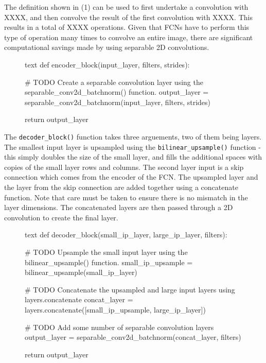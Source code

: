 \documentclass[a4paper]{article}
\begin{document}
The definition shown in (1) can be used to first undertake a convolution with XXXX, and then convolve the result of the first convolution with XXXX. This results in a total of XXXX operations. Given that FCNs have to perform this type of operation many times to convolve an entire image, there are significant computational savings made by using separable 2D convolutions.
   
\begin{figure}[h]\scriptsize
\begin{sexylisting}{text}
def encoder_block(input_layer, filters, strides):
    
    # TODO Create a separable convolution layer using the separable_conv2d_batchnorm() function.
    output_layer = separable_conv2d_batchnorm(input_layer, filters, strides)
    
    return output_layer
\end{sexylisting}
\end{figure}

The \verb|decoder_block()| function takes three arguements, two of them being layers. The smallest input layer is upsampled using the \verb|bilinear_upsample()| function - this simply doubles the size of the small layer, and fills the additional spaces with copies of the small layer rows and columns. The second layer input is a skip connection which comes from the encoder of the FCN. The upsampled layer and the layer from the skip connection are added together using a concatenate function. Note that care must be taken to ensure there is no mismatch in the layer dimensions. The concatenated layers are then passed through a 2D convolution to create the final layer.  

\begin{figure}[h]\scriptsize
\begin{sexylisting}{text}
def decoder_block(small_ip_layer, large_ip_layer, filters):
    
    # TODO Upsample the small input layer using the bilinear_upsample() function.
    small_ip_upsample = bilinear_upsample(small_ip_layer)
    
    # TODO Concatenate the upsampled and large input layers using layers.concatenate
    concat_layer = layers.concatenate([small_ip_upsample, large_ip_layer])
    
    # TODO Add some number of separable convolution layers
    output_layer = separable_conv2d_batchnorm(concat_layer, filters)
    
    return output_layer
\end{sexylisting}
\end{figure}
\end{document}
